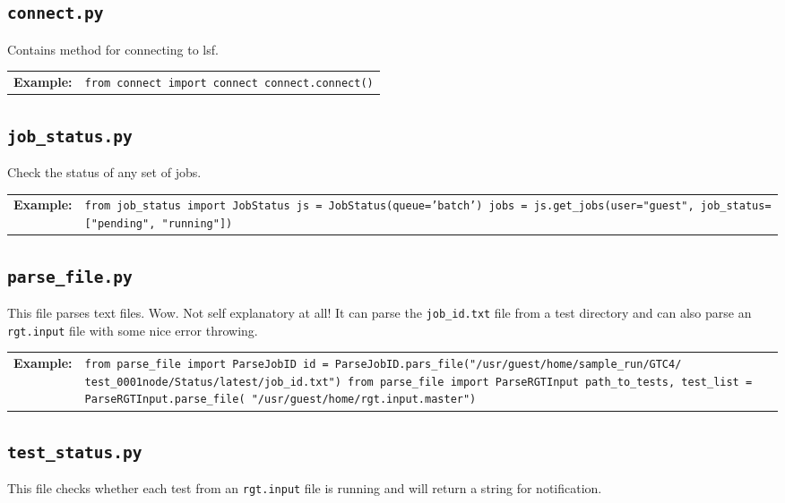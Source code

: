 \documentclass{article}
\newcommand{\example}[1]{
\begin{tabular}{ l p{\textwidth} }
	\textbf{Example:} & \texttt{#1}
\end{tabular}
}
\newcommand{\un}[0]{\_}
\begin{document}
\subsection{\texttt{connect.py}}

Contains method for connecting to lsf.

\example{from connect import connect \newline
		 connect.connect()}

\subsection{\texttt{job\un status.py}}

Check the status of any set of jobs.

\example{from job\un status import JobStatus \newline
		 js = JobStatus(queue='batch') \newline
		 jobs = js.get\un jobs(user="guest", job\un status=["pending", "running"])}

\subsection{\texttt{parse\un file.py}}

This file parses text files. Wow. Not self explanatory at all! It can parse the \texttt{job\un id.txt} file from a test directory and can also parse an \texttt{rgt.input} file with some nice error throwing.

\example{from parse\un file import ParseJobID \newline
		 id = ParseJobID.pars\un file("/usr/guest/home/sample\un run/GTC4/\newline
		 test\un 0001node/Status/latest/job\un id.txt") \newline
		 \newline
		 from parse\un file import ParseRGTInput \newline
		 path\un to\un tests, test\un list = ParseRGTInput.parse\un file(\newline
		 "/usr/guest/home/rgt.input.master")
		 }

\subsection{\texttt{test\un status.py}}

This file checks whether each test from an \texttt{rgt.input} file is running and will return a string for notification.
\end{document}
